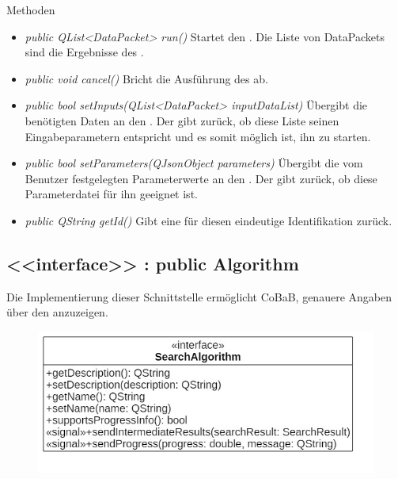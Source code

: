 Methoden
\begin{itemize}
\item\textit{public QList<DataPacket> run()} Startet den . Die Liste von DataPackets sind die Ergebnisse des .
\item\textit{public void cancel()} Bricht die Ausführung des  ab.
\item\textit{public bool setInputs(QList<DataPacket> inputDataList)} Übergibt die benötigten Daten an den . Der  gibt zurück, ob diese Liste seinen Eingabeparametern entspricht und es somit möglich ist, ihn zu starten.
\item\textit{public bool setParameters(QJsonObject parameters)} Übergibt die vom Benutzer festgelegten Parameterwerte an den . Der  gibt zurück, ob diese Parameterdatei für ihn geeignet ist.
\item\textit{public QString getId()} Gibt eine für diesen  eindeutige Identifikation zurück.
\end{itemize}

\pagebreak

\subsection*{<<interface>>  : public Algorithm}
Die Implementierung dieser Schnittstelle ermöglicht CoBaB, genauere Angaben über den  anzuzeigen.

\begin{figure}[H]
\centering
\includegraphics[scale=0.5]{img/Klassendiagramm/Klassen/Model/SearchAlgorithm}
\label{fig:searchAlgorithm}
\end{figure}

